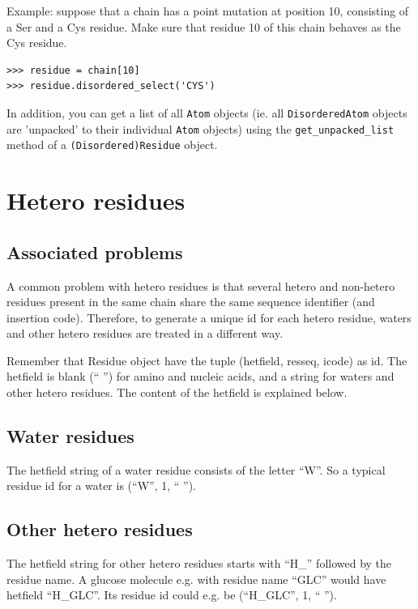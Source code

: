 \documentclass{report}
\begin{document}
Example: suppose that a chain has a point mutation at position 10,
consisting of a Ser and a Cys residue. Make sure that residue 10 of
this chain behaves as the Cys residue.
\begin{verbatim}
>>> residue = chain[10]
>>> residue.disordered_select('CYS')
\end{verbatim}
In addition, you can get a list of all \texttt{Atom} objects (ie.
all \texttt{DisorderedAtom} objects are 'unpacked' to their individual
\texttt{Atom} objects) using the \texttt{get\_unpacked\_list} method
of a \texttt{(Disordered)\-Residue} object.

\section{Hetero residues}

\subsection{Associated problems\label{hetero problems}}

A common problem with hetero residues is that several hetero and non-hetero
residues present in the same chain share the same sequence identifier (and insertion
code). Therefore, to generate a unique id for each hetero residue, waters and
other hetero residues are treated in a different way.

Remember that Residue object have the tuple (hetfield, resseq, icode) as id.
The hetfield is blank (`` '') for amino and nucleic acids, and a string
for waters and other hetero residues. The content of the hetfield is explained
below.

\subsection{Water residues}

The hetfield string of a water residue consists of the letter ``W''. So
a typical residue id for a water is (``W'', 1, `` '').

\subsection{Other hetero residues}

The hetfield string for other hetero residues starts with ``H\_'' followed
by the residue name. A glucose molecule e.g. with residue name ``GLC''
would have hetfield ``H\_GLC''. Its residue id could e.g. be (``H\_GLC'',
1, `` '').
\end{document}
